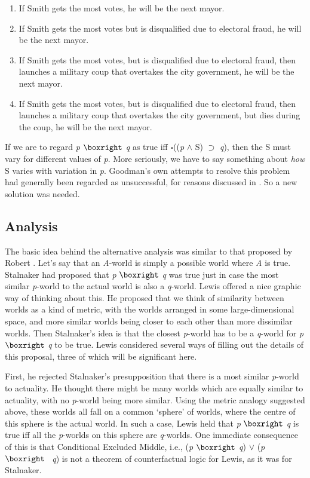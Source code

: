 \begin{enumerate}
\renewcommand{\labelenumi}{(3.\arabic{enumi})}
\item If Smith gets the most votes, he will be the next mayor. 
\item If Smith gets the most votes but is disqualified due to electoral fraud, he will be the next mayor.
\item If Smith gets the most votes, but is disqualified due to electoral fraud, then launches a military coup that overtakes the city government, he will be the next mayor.
\item If Smith gets the most votes, but is disqualified due to electoral fraud, then launches a military coup that overtakes the city government, but dies during the coup, he will be the next mayor.
\end{enumerate}

If we are to regard \textit{p} \(\boxright\) \textit{q} as true iff \(\square\)((\textit{p} \(\wedge\) S) \(\supset\) \textit{q}), then the S must vary for different values of \textit{p}. More seriously, we have to say something about \textit{how} S varies with variation in \textit{p}. Goodman's own attempts to resolve this problem had generally been regarded as unsuccessful, for reasons discussed in \citet{Bennett1984}. So a new solution was needed.

\subsection{Analysis} 
The basic idea behind the alternative analysis was similar to that proposed by Robert \citet{Stalnaker1968}. Let's say that an \textit{A}-world is simply a possible world where \textit{A} is true. Stalnaker had proposed that \textit{p} \(\boxright\) \textit{q} was true just in case the most similar \textit{p}-world to the actual world is also a \textit{q}-world. Lewis offered a nice graphic way of thinking about this. He proposed that we think of similarity between worlds as a kind of metric, with the worlds arranged in some large-dimensional space, and more similar worlds being closer to each other than more dissimilar worlds. Then Stalnaker's idea is that the closest \textit{p}-world has to be a \textit{q}-world for \textit{p} \(\boxright\) \textit{q} to be true. Lewis considered several ways of filling out the details of this proposal, three of which will be significant here.

First, he rejected Stalnaker's presupposition that there is a most similar \textit{p}-world to actuality. He thought there might be many worlds which are equally similar to actuality, with no \textit{p}-world being more similar. Using the metric analogy suggested above, these worlds all fall on a common `sphere' of worlds, where the centre of this sphere is the actual world. In such a case, Lewis held that \textit{p} \(\boxright\) \textit{q} is true iff all the \textit{p}-worlds on this sphere are \textit{q}-worlds. One immediate consequence of this is that Conditional Excluded Middle, i.e., (\textit{p} \(\boxright\) \textit{q}) \(\vee\) (\textit{p} \(\boxright\) ~\textit{q}) is not a theorem of counterfactual logic for Lewis, as it was for Stalnaker.

